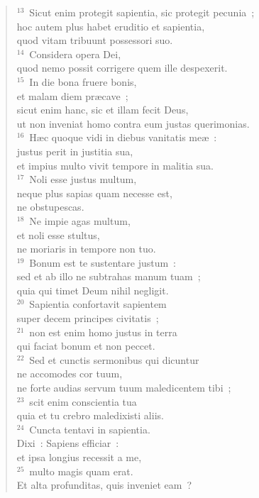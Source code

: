 \begin{verse}
${}^{13}$~Sicut enim protegit sapientia, sic protegit pecunia~;\\ hoc autem plus habet eruditio et sapientia,\\ quod vitam tribuunt possessori suo.\\
${}^{14}$~Considera opera Dei,\\ quod nemo possit corrigere quem ille despexerit.\\
${}^{15}$~In die bona fruere bonis,\\ et malam diem pr\ae cave~;\\ sicut enim hanc, sic et illam fecit Deus,\\ ut non inveniat homo contra eum justas querimonias.\\
${}^{16}$~H\ae c quoque vidi in diebus vanitatis me\ae~:\\ justus perit in justitia sua,\\ et impius multo vivit tempore in malitia sua.\\
${}^{17}$~Noli esse justus multum,\\ neque plus sapias quam necesse est,\\ ne obstupescas.\\
${}^{18}$~Ne impie agas multum,\\ et noli esse stultus,\\ ne moriaris in tempore non tuo.\\
${}^{19}$~Bonum est te sustentare justum~:\\ sed et ab illo ne subtrahas manum tuam~;\\ quia qui timet Deum nihil negligit.\\
${}^{20}$~Sapientia confortavit sapientem\\ super decem principes civitatis~;\\
${}^{21}$~non est enim homo justus in terra\\ qui faciat bonum et non peccet.\\
${}^{22}$~Sed et cunctis sermonibus qui dicuntur\\ ne accomodes cor tuum,\\ ne forte audias servum tuum maledicentem tibi~;\\
${}^{23}$~scit enim conscientia tua\\ quia et tu crebro maledixisti aliis.\\
${}^{24}$~Cuncta tentavi in sapientia.\\ Dixi~: Sapiens efficiar~:\\ et ipsa longius recessit a me,\\
${}^{25}$~multo magis quam erat.\\ Et alta profunditas, quis inveniet eam~?\end{verse}


